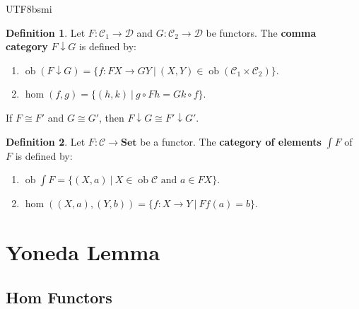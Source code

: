 \documentclass[12pt]{article}
\theoremstyle{definition}
\newtheorem{definition}{Definition}[section]
\newcommand\<{\langle}
\renewcommand\>{\rangle}
\DeclareMathOperator{\ob}{ob}
\begin{document}
\begin{CJK}{UTF8}{bsmi}
\begin{definition}
    Let $F:\mathcal{C}_1\to\mathcal{D}$ and $G:\mathcal{C}_2\to\mathcal{D}$ be functors.
    The \textbf{comma category} $F\downarrow G$ is defined by:
    \begin{enumerate}
        \item $\ob(F\downarrow G)=\{f:FX\to GY\ |\ (X, Y)\in\ob(\mathcal{C}_1\times\mathcal{C}_2)\}$.
        \item $\hom(f, g)=\{(h, k)\ |\ g\circ Fh=Gk\circ f\}$.
    \end{enumerate}
    \begin{center}
    \end{center}
\end{definition}

If $F\cong F'$ and $G\cong G'$, then $F\downarrow G\cong F'\downarrow G'$.

\begin{definition}
    Let $F:\mathcal{C}\to\textbf{Set}$ be a functor.
    The \textbf{category of elements} $\int F$ of $F$ is defined by:
    \begin{enumerate}
        \item $\ob\int F=\{(X, a)\ |\ X\in\ob\mathcal{C}\text{ and }a\in FX\}$.
        \item $\hom((X, a), (Y, b))=\{f:X\to Y\ |\ Ff(a)=b\}$.
    \end{enumerate}
\end{definition}

\section{Yoneda Lemma}

\subsection{Hom Functors}


\end{CJK}
\end{document}
